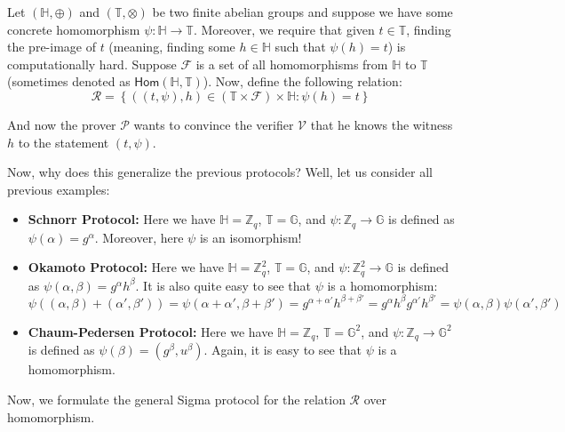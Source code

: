 \documentclass[../lecture-notes.tex]{subfiles}
\begin{document}
Let $(\mathbb{H}, \oplus)$ and $(\mathbb{T}, \otimes)$ be two finite abelian groups and suppose we have some concrete homomorphism $\psi: \mathbb{H} \to \mathbb{T}$. Moreover, we require that given $t \in \mathbb{T}$, finding the pre-image of $t$ (meaning, finding some $h \in \mathbb{H}$ such that $\psi(h)=t$) is computationally hard. Suppose $\mathcal{F}$ is a set of all homomorphisms from $\mathbb{H}$ to $\mathbb{T}$ (sometimes denoted as $\mathsf{Hom}(\mathbb{H}, \mathbb{T})$). Now, define the following relation:
\begin{equation*}
    \mathcal{R} = \left\{ ((t,\psi), h) \in (\mathbb{T} \times \mathcal{F}) \times \mathbb{H}: \psi(h) = t \right\}
\end{equation*}

And now the prover $\mathcal{P}$ wants to convince the verifier $\mathcal{V}$ that he knows the witness $h$ to the statement $(t,\psi)$. 
\begin{proposition}
    Now, why does this generalize the previous protocols? Well, let us consider all previous examples:
    \begin{itemize}
        \item \textbf{Schnorr Protocol:} Here we have $\mathbb{H} = \mathbb{Z}_q$, $\mathbb{T} = \mathbb{G}$, and $\psi: \mathbb{Z}_q \to \mathbb{G}$ is defined as $\psi(\alpha) = g^{\alpha}$. Moreover, here $\psi$ is an isomorphism!
        \item \textbf{Okamoto Protocol:} Here we have $\mathbb{H} = \mathbb{Z}_q^2$, $\mathbb{T} = \mathbb{G}$, and $\psi: \mathbb{Z}_q^2 \to \mathbb{G}$ is defined as $\psi(\alpha,\beta) = g^{\alpha}h^{\beta}$. It is also quite easy to see that $\psi$ is a homomorphism:
        \begin{equation*}
            \psi((\alpha,\beta) + (\alpha',\beta')) = \psi(\alpha+\alpha',\beta+\beta') = g^{\alpha+\alpha'}h^{\beta+\beta'} = g^{\alpha}h^{\beta}g^{\alpha'}h^{\beta'} = \psi(\alpha,\beta)\psi(\alpha',\beta')
        \end{equation*}
        \item \textbf{Chaum-Pedersen Protocol:} Here we have $\mathbb{H} = \mathbb{Z}_q$, $\mathbb{T} = \mathbb{G}^2$, and $\psi: \mathbb{Z}_q \to \mathbb{G}^2$ is defined as $\psi(\beta) = (g^{\beta},u^{\beta})$. Again, it is easy to see that $\psi$ is a homomorphism.
    \end{itemize}
\end{proposition}

Now, we formulate the general Sigma protocol for the relation $\mathcal{R}$ over homomorphism.
\end{document}
